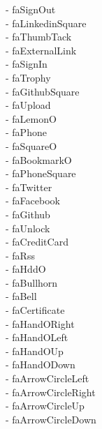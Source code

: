\documentclass[%
               doublesided,
               paper=a4,
               fontsize=10pt
              ]{my-resume}
\begin{document}
- faSignOut\\ \faLinkedinSquare - faLinkedinSquare\\ \faThumbTack - faThumbTack\\ \faExternalLink - faExternalLink\\ \faSignIn - faSignIn\\ \faTrophy - faTrophy\\ \faGithubSquare - faGithubSquare\\ \faUpload - faUpload\\ \faLemonO - faLemonO\\ \faPhone - faPhone\\ \faSquareO - faSquareO\\ \faBookmarkO - faBookmarkO\\ \faPhoneSquare - faPhoneSquare\\ \faTwitter - faTwitter\\ \faFacebook - faFacebook\\ \faGithub - faGithub\\ \faUnlock - faUnlock\\ \faCreditCard - faCreditCard\\ \faRss - faRss\\ \faHddO - faHddO\\ \faBullhorn - faBullhorn\\ \faBell - faBell\\ \faCertificate - faCertificate\\ \faHandORight - faHandORight\\ \faHandOLeft - faHandOLeft\\ \faHandOUp - faHandOUp\\ \faHandODown - faHandODown\\ \faArrowCircleLeft - faArrowCircleLeft\\ \faArrowCircleRight - faArrowCircleRight\\ \faArrowCircleUp - faArrowCircleUp\\ \faArrowCircleDown - faArrowCircleDown\\ 
\end{document}
